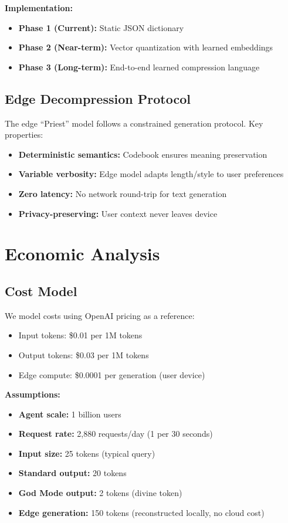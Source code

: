 \documentclass{article}
\begin{document}
\textbf{Implementation:}
\begin{itemize}
    \item \textbf{Phase 1 (Current):} Static JSON dictionary
    \item \textbf{Phase 2 (Near-term):} Vector quantization with learned embeddings
    \item \textbf{Phase 3 (Long-term):} End-to-end learned compression language
\end{itemize}

\subsection{Edge Decompression Protocol}

The edge ``Priest'' model follows a constrained generation protocol. Key properties:
\begin{itemize}
    \item \textbf{Deterministic semantics:} Codebook ensures meaning preservation
    \item \textbf{Variable verbosity:} Edge model adapts length/style to user preferences
    \item \textbf{Zero latency:} No network round-trip for text generation
    \item \textbf{Privacy-preserving:} User context never leaves device
\end{itemize}

\section{Economic Analysis}

\subsection{Cost Model}

We model costs using OpenAI pricing as a reference:
\begin{itemize}
    \item Input tokens: \$0.01 per 1M tokens
    \item Output tokens: \$0.03 per 1M tokens
    \item Edge compute: \$0.0001 per generation (user device)
\end{itemize}

\textbf{Assumptions:}
\begin{itemize}
    \item \textbf{Agent scale:} 1 billion users
    \item \textbf{Request rate:} 2,880 requests/day (1 per 30 seconds)
    \item \textbf{Input size:} 25 tokens (typical query)
    \item \textbf{Standard output:} 20 tokens
    \item \textbf{God Mode output:} 2 tokens (divine token)
    \item \textbf{Edge generation:} 150 tokens (reconstructed locally, no cloud cost)
\end{itemize}
\end{document}
